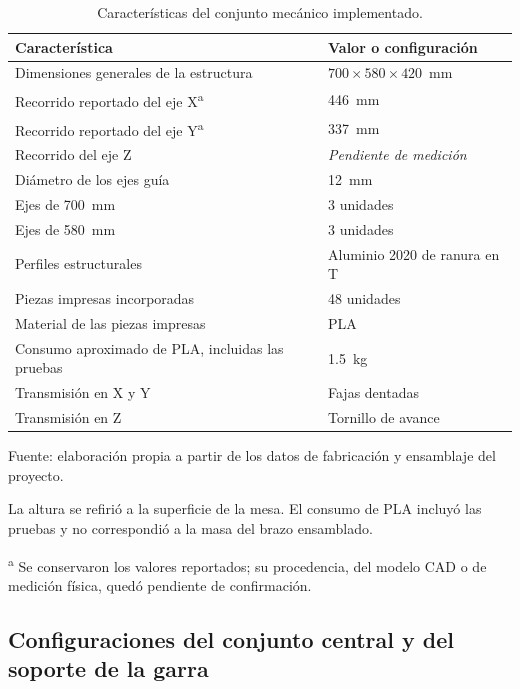\begin{table}[H]
    \centering
    \caption{Características del conjunto mecánico implementado.}
    \label{tab:fase3_caracteristicas}
    \begin{tabular}{p{}p{}}
        \hline
        Característica & Valor o configuración \\
        \hline
        Dimensiones generales de la estructura & $700 \times 580 \times 420$~mm \\
        Recorrido reportado del eje X\textsuperscript{a} & 446~mm \\
        Recorrido reportado del eje Y\textsuperscript{a} & 337~mm \\
        Recorrido del eje Z & \textit{Pendiente de medición} \\
        Diámetro de los ejes guía & 12~mm \\
        Ejes de 700~mm & 3 unidades \\
        Ejes de 580~mm & 3 unidades \\
        Perfiles estructurales & Aluminio 2020 de ranura en T \\
        Piezas impresas incorporadas & 48 unidades \\
        Material de las piezas impresas & PLA \\
        Consumo aproximado de PLA, incluidas las pruebas & 1.5~kg \\
        Transmisión en X y Y & Fajas dentadas \\
        Transmisión en Z & Tornillo de avance \\
        \hline
    \end{tabular}
    \par\small\raggedright Fuente: elaboración propia a partir de los datos de fabricación y ensamblaje del proyecto.
    \par\small La altura se refirió a la superficie de la mesa. El consumo de PLA incluyó las pruebas y no correspondió a la masa del brazo ensamblado.
    \par\small\textsuperscript{a} Se conservaron los valores reportados; su procedencia, del modelo CAD o de medición física, quedó pendiente de confirmación.
\end{table}

\subsection{Configuraciones del conjunto central y del soporte de la garra}


